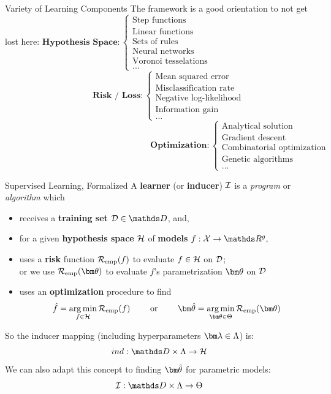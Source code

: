 \documentclass[11pt,compress,t,notes=noshow, xcolor=table]{beamer}
\begin{document}
\begin{framev}[footnotesize]{Variety of Learning Components}
The framework is a good orientation to not get lost here:
\vfill
$\textbf{Hypothesis Space}:
\begin{cases} 
\text{Step functions} \\
\text{Linear functions}\\
\text{Sets of rules}\\
\text{Neural networks}\\
\text{Voronoi tesselations}\\
\text{...}
\end{cases}$
$\phantom{Hypothesis Space RISK } \textbf{Risk / Loss}: \begin{cases}
\text{Mean squared error}\\
\text{Misclassification rate}\\
\text{Negative log-likelihood}\\
\text{Information gain}\\
\text{...}
\end{cases}$
$\phantom{hypothesis space risk RISK RISK RISK} \textbf{Optimization}: \begin{cases}
\text{Analytical solution}\\
\text{Gradient descent}\\
\text{Combinatorial optimization}\\
\text{Genetic algorithms}\\
\text{...}
\end{cases}$
\end{framev}


\begin{framev}{Supervised Learning, Formalized}
A \textbf{learner} (or \textbf{inducer}) $\mathcal{I}$ is a \emph{program} or \emph{algorithm} which
\begin{itemize}
\item receives a \textbf{training set} $\D \in \allDatasets$, and,
\item for a given \textbf{hypothesis space} $\mathcal{H}$ of \textbf{models} $f:\Xspace \rightarrow \R^g,$ 
\item uses a \textbf{risk} function $\mathcal{R}_{\text{emp}}(f)$ to evaluate $f \in \mathcal{H}$ on $\mathcal{D}$;\\ 
or we use $\risket$ to evaluate $f$'s parametrization $\thetav$ on $\mathcal{D}$
\item uses an \textbf{optimization} procedure to find
$$
\fh = \argmin_{f \in \Hspace} \riskef \qquad \text{ or } \qquad \thetavh = \argmin_{\thetav \in \Theta} \risket
$$
\end{itemize}
So the inducer mapping (including hyperparameters $\lamv \in \Lam$) is:
$$
ind: \preimageInducerShort\rightarrow \Hspace
$$
We can also adapt this concept to finding $\thetavh$ for parametric models:
$$
\ind: \preimageInducerShort \rightarrow \Theta
$$
\end{framev}
\end{document}
